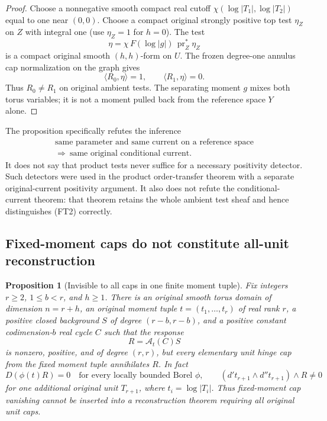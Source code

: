 \documentclass[11pt,a4paper]{article}
\numberwithin{equation}{section}
\newtheorem{proposition}[theorem]{Proposition}
\theoremstyle{definition}
\theoremstyle{remark}
\begin{document}
\begin{proof}
Choose a nonnegative smooth compact real cutoff
$\chi(\log|T_1|,\log|T_2|)$ equal to one near $(0,0)$.
Choose a compact original strongly positive top test $\eta_Z$
on $Z$ with integral one (use $\eta_Z=1$ for $h=0$). The test
\[
                  \eta=\chi\,F(\log|g|)\,\operatorname{pr}_Z^*\eta_Z
                                                                    \tag{FT5}
\]
is a compact original smooth $(h,h)$-form on $U$. The frozen
degree-one annulus cap normalization on the graph gives
\[
                            \langle R_0,\eta\rangle=1,
                            \qquad\langle R_1,\eta\rangle=0.        \tag{FT6}
\]
Thus $R_0\ne R_1$ on original ambient tests. The separating moment
$g$ mixes both torus variables; it is not a moment pulled back
from the reference space $Y$ alone.
\end{proof}

The proposition specifically refutes the inference
\[
 \begin{gathered}
 \text{same parameter and same current on a reference space}\\
     \Longrightarrow\ \text{same original conditional current}.
 \end{gathered}
                                                                    \tag{FT7}
\]
It does not say that product tests never suffice for a necessary
positivity detector. Such detectors were used in the product
order-transfer theorem with a separate original-current positivity
argument. It also does not refute the conditional-current theorem:
that theorem retains the whole ambient test sheaf and hence
distinguishes (FT2) correctly.

\subsection{Fixed-moment caps do not constitute all-unit reconstruction}

\begin{proposition}[Invisible to all caps in one finite moment tuple]
\label{prop:r12-fixed-moment-cap-blindness}
Fix integers $r\ge2$, $1\le b<r$, and $h\ge1$. There is an original
smooth torus domain of dimension $n=r+h$, an original moment tuple
$t=(t_1,\ldots,t_r)$ of real rank $r$, a positive closed background
$S$ of degree $(r-b,r-b)$, and a positive constant codimension-$b$
real cycle $C$ such that the response
\[
                            R=\mathcal A_t(C)S                     \tag{FT8}
\]
is nonzero, positive, and of degree $(r,r)$, but every elementary
unit hinge cap from the fixed moment tuple annihilates $R$.
In fact
\[
        D(\phi(t)R)=0
        \quad\text{for every locally bounded Borel }\phi,
        \qquad
        (d't_{r+1}\wedge d''t_{r+1})\wedge R\ne0                  \tag{FT9}
\]
for one additional original unit $T_{r+1}$, where
$t_i=\log|T_i|$. Thus fixed-moment cap vanishing cannot be inserted
into a reconstruction theorem requiring all original unit caps.
\end{proposition}
\end{document}
